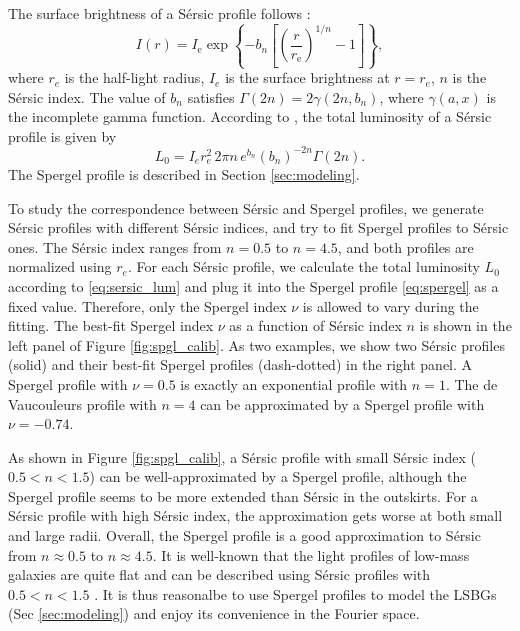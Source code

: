 \documentclass[twocolumn,astrosymb,twocolappendix]{aastex631}
\newcommand{\sersic}{S\'ersic}
\begin{document}
\begin{CJK*}{UTF8}{gbsn}
The surface brightness of a \sersic{} profile follows \citep{Sersic1963,Graham2005}:
\begin{equation}\label{eq:sersic}
    I(r)=I_{\mathrm{e}} \exp \left\{-b_{n}\left[\left(\frac{r}{r_{\mathrm{e}}}\right)^{1 / n}-1\right]\right\},
\end{equation}
where $r_e$ is the half-light radius, $I_e$ is the surface brightness at $r=r_e$, $n$ is the \sersic{} index. The value of $b_n$ satisfies $\Gamma(2 n)=2 \gamma\left(2 n, b_{n}\right)$, where $\gamma(a, x)$ is the incomplete gamma function. According to \citet{Graham2005}, the total luminosity of a \sersic{} profile is given by 
\begin{equation}\label{eq:sersic_lum}
    L_0 = I_{e} r_{e}^{2}\, 2 \pi n\, e^{b_{n}} \left(b_{n}\right)^{-2 n} \Gamma(2 n).
\end{equation}
The Spergel profile is described in Section \ref{sec:modeling}. 

To study the correspondence between \sersic{} and Spergel profiles, we generate \sersic{} profiles with different \sersic{} indices, and try to fit Spergel profiles to \sersic{} ones. The \sersic{} index ranges from $n=0.5$ to $n=4.5$, and both profiles are normalized using $r_e$. For each \sersic{} profile, we calculate the total luminosity $L_0$ according to \eqref{eq:sersic_lum} and plug it into the Spergel profile \eqref{eq:spergel} as a fixed value. Therefore, only the Spergel index $\nu$ is allowed to vary during the fitting. The best-fit Spergel index $\nu$ as a function of \sersic{} index $n$ is shown in the left panel of Figure \ref{fig:spgl_calib}. As two examples, we show two \sersic{} profiles (solid) and their best-fit Spergel profiles (dash-dotted) in the right panel. A Spergel profile with $\nu=0.5$ is exactly an exponential profile with $n=1$. The de Vaucouleurs profile \citep{deVaucouleurs1948} with $n=4$ can be approximated by a Spergel profile with $\nu=-0.74$. 

As shown in Figure \ref{fig:spgl_calib}, a \sersic{} profile with small \sersic{} index ($0.5 < n < 1.5$) can be well-approximated by a Spergel profile, although the Spergel profile seems to be more extended than \sersic{} in the outskirts. For a \sersic{} profile with high \sersic{} index, the approximation gets worse at both small and large radii. Overall, the Spergel profile is a good approximation to \sersic{} from $n\approx 0.5$ to $n\approx 4.5$. It is well-known that the light profiles of low-mass galaxies are quite flat and can be described using \sersic{} profiles with $0.5 < n < 1.5$ \citep[e.g.,][]{vanDokkum2015,Lange2015,Greco2018,Zaritsky2021,ELVES-I}. It is thus reasonalbe to use Spergel profiles to model the LSBGs (Sec \ref{sec:modeling}) and enjoy its convenience in the Fourier space. 




\end{CJK*}
\end{document}
